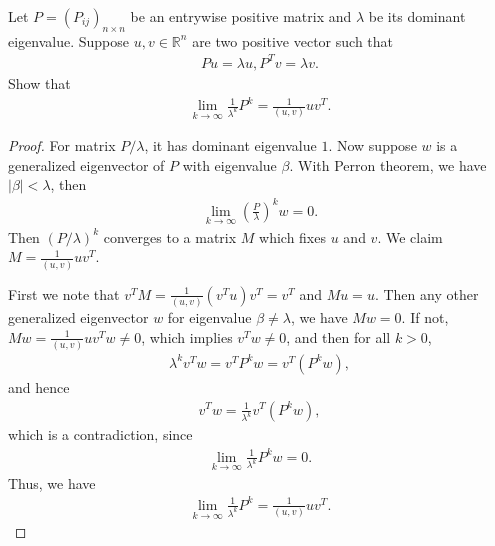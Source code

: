 \documentclass[12pt]{article}
\begin{document}
\medskip

Let $P = \left(P_{ij}\right)_{n\times n}$ be an entrywise positive matrix and $\lambda$ be its dominant eigenvalue. Suppose $u,v\in \mathbb{R}^n$ are two positive vector such that
\begin{align*}
    Pu = \lambda u, P^T v = \lambda v.
\end{align*}
Show that
\begin{align*}
    \lim_{k\to\infty} \frac{1}{\lambda^k} P^k = \frac{1}{(u,v)} u v^T.
\end{align*}
\begin{proof}
For matrix $P/\lambda$, it has dominant eigenvalue $1$. Now suppose $w$ is a generalized eigenvector of $P$ with eigenvalue $\beta$. With Perron theorem, we have $|\beta| < \lambda$, then 
\begin{align*}
    \lim_{k\to\infty} \left(\frac{P}{\lambda}\right)^k w = 0.
\end{align*}
Then $\left(P/\lambda \right)^k$ converges to a matrix $M$ which fixes $u$ and $v$. We claim $M = \frac{1}{(u,v)} u v^T$. 

First we note that $v^T M = \frac{1}{(u,v)} (v^T u) v^T = v^T$ and $Mu = u$. Then any other generalized eigenvector $w$ for eigenvalue $\beta \neq \lambda$, we have $Mw = 0$. If not, $Mw = \frac{1}{(u,v)} u v^T w \neq 0$, which implies $v^T w \neq 0$, and then for all $k > 0$, 
\begin{align*}
    \lambda^k v^T w = v^T P^k w = v^T \left(P^k w\right),
\end{align*}
and hence 
\begin{align*}
    v^T w = \frac{1}{\lambda^k} v^T \left(P^k w\right),
\end{align*}
which is a contradiction, since 
\begin{align*}
    \lim_{k\to\infty} \frac{1}{\lambda^k} P^k w = 0.
\end{align*}
Thus, we have
\begin{align*}
    \lim_{k\to\infty} \frac{1}{\lambda^k} P^k = \frac{1}{(u,v)} u v^T.
\end{align*}
\end{proof}
\end{document}
